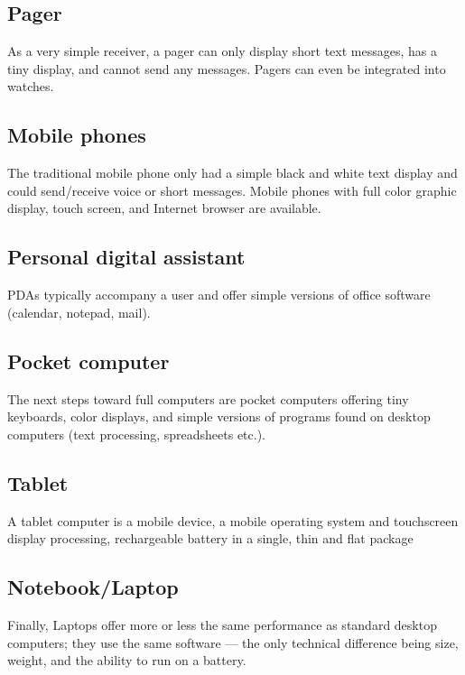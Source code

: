 \subsection*{Pager}
As a very simple receiver, a pager can only display short text messages, has a tiny display, and cannot send any messages. Pagers can even be integrated into watches.

\subsection*{Mobile phones}
The traditional mobile phone only had a simple black and white text display and could send/receive voice or short messages. Mobile phones with full
color graphic display, touch screen, and Internet browser are available.

\subsection*{Personal digital assistant}
PDAs typically accompany a user and offer
simple versions of office software (calendar, notepad, mail).

\subsection*{Pocket computer}
The next steps toward full computers are pocket computers offering tiny keyboards, color displays, and simple versions of programs found on desktop computers (text processing, spreadsheets etc.).


\subsection*{Tablet}
A tablet computer is a mobile device, a mobile operating system and touchscreen display processing, rechargeable battery in a single, thin and flat package

\subsection*{Notebook/Laptop}
Finally, Laptops offer more or less the same performance as standard desktop computers; they use the same software — the only technical difference being size, weight, and the ability to run on a battery.


%
%
%

